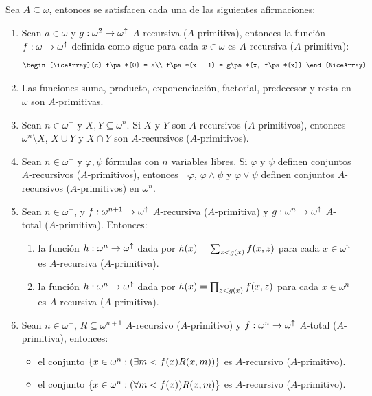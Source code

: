\begin{theorem}
	Sea $A\subseteq\omega$, entonces se satisfacen cada una de las siguientes afirmaciones:

	\begin{enumerate}
		\item Sean $a\in\omega$ y $g:\omega^{2}\to\omega^{\uparrow}$ $A$-recursiva ($A$-primitiva), entonces la función $f:\omega\to\omega^{\uparrow}$ definida como sigue para cada $x\in\omega$ es $A$-recursiva ($A$-primitiva):
		\[
			\begin{NiceArray}{c}
				f\pa*{0} = a\\
				f\pa*{x + 1} = g\pa*{x, f\pa*{x}}
			\end{NiceArray}
		\]
		\item Las funciones suma, producto, exponenciación, factorial, predecesor y resta en $\omega$ son $A$-primitivas.
		\item Sean $n\in\omega^{+}$ y $X, Y\subseteq\omega^{n}$. Si $X$ y $Y$ son $A$-recursivos ($A$-primitivos), entonces $\omega^{n}\setminus X$, $X\cup Y$ y $X\cap Y$ son $A$-recursivos ($A$-primitivos).
		\item Sean $n\in\omega^{+}$ y $\varphi,\psi$ fórmulas con $n$ variables libres. Si $\varphi$ y $\psi$ definen conjuntos $A$-recursivos ($A$-primitivos), entonces $\neg\varphi$, $\varphi\land\psi$ y $\varphi\vee\psi$ definen conjuntos $A$-recursivos ($A$-primitivos) en $\omega^{n}$.
		\item Sean $n\in\omega^{+}$, y $f:\omega^{n + 1}\to\omega^{\uparrow}$ $A$-recursiva ($A$-primitiva) y $g:\omega^{n}\to\omega^{\uparrow}$ $A$-total ($A$-primitiva). Entonces:

		\begin{enumerate}
			\item la función $h:\omega^{n}\to\omega^{\uparrow}$ dada por $h\pa*{x} =\sum_{z < g\pa*{x}}f\pa*{x, z}$ para cada $x\in\omega^{n}$ es $A$-recursiva ($A$-primitiva).
			\item la función $h:\omega^{n}\to\omega^{\uparrow}$ dada por $h\pa*{x} =\prod_{z < g\pa*{x}}f\pa*{x, z}$ para cada $x\in\omega^{n}$ es $A$-recursiva ($A$-primitiva).
		\end{enumerate}

		\item Sean $n\in\omega^{+}$, $R\subseteq\omega^{n + 1}$ $A$-recursivo ($A$-primitivo) y $f:\omega^{n}\to\omega^{\uparrow}$ $A$-total ($A$-primitiva), entonces:

		\begin{itemize}
			\item el conjunto $\set{x\in\omega^{n}:\pa*{\exists m < f\pa*{x}R\pa*{x, m}}}$ es $A$-recursivo ($A$-primitivo).
			\item el conjunto $\set{x\in\omega^{n}:\pa*{\forall m < f\pa*{x}}R\pa*{x, m}}$ es $A$-recursivo ($A$-primitivo).
		\end{itemize}


\end{enumerate}
\end{theorem}
